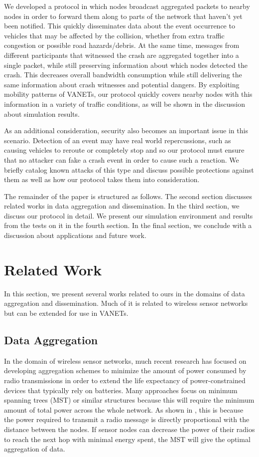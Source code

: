 \documentclass{IEEEtran}
\begin{document}
We developed a protocol in which nodes broadcast aggregated packets to nearby nodes in order to forward them along to parts of the network that haven't yet been notified.
This quickly disseminates data about the event occurrence to vehicles that may be affected by the collision, whether from extra traffic congestion or possible road hazards/debris.
At the same time, messages from different participants that witnessed the crash are aggregated together into a single packet, while still preserving information about which nodes detected the crash.
This decreases overall bandwidth consumption while still delivering the same information about crash witnesses and potential dangers.
By exploiting mobility patterns of VANETs, our protocol quickly covers nearby nodes with this information in a variety of traffic conditions, as will be shown in the discussion about simulation results.

As an additional consideration, security also becomes an important issue in this scenario.
Detection of an event may have real world repercussions, such as causing vehicles to reroute or completely stop and so our protocol must ensure that no attacker can fake a crash event in order to cause such a reaction.
We briefly catalog known attacks of this type and discuss possible protections against them as well as how our protocol takes them into consideration.

The remainder of the paper is structured as follows.  The second section discusses related works in data aggregation and dissemination.
In the third section, we discuss our protocol in detail.  We present our simulation environment and results from the tests on it in the fourth section.
In the final section, we conclude with a discussion about applications and future work.

\section{Related Work}

In this section, we present several works related to ours in the domains of data aggregation and dissemination.  Much of it is related to wireless sensor networks but can be extended for use in VANETs.

\subsection{Data Aggregation}

In the domain of wireless sensor networks, much recent research has focused on developing aggregation schemes to minimize the amount of power consumed by radio transmissions in order to extend the life expectancy of power-constrained devices that typically rely on batteries.
Many approaches focus on minimum spanning trees (MST) or similar structures because this will require the minimum amount of total power across the whole network.
As shown in \cite{heuristic}, this is because the power required to transmit a radio message is directly proportional with the distance between the nodes.
If sensor nodes can decrease the power of their radios to reach the next hop with minimal energy spent, the MST will give the optimal aggregation of data.
\end{document}
